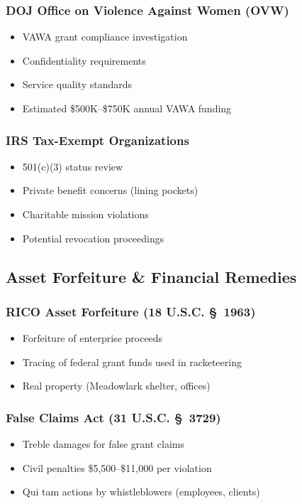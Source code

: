 \documentclass[11pt,letterpaper]{article}
\begin{document}
\subsubsection{DOJ Office on Violence Against Women (OVW)}
\begin{itemize}[leftmargin=*]
\item VAWA grant compliance investigation
\item Confidentiality requirements
\item Service quality standards
\item Estimated \$500K--\$750K annual VAWA funding
\end{itemize}

\subsubsection{IRS Tax-Exempt Organizations}
\begin{itemize}[leftmargin=*]
\item 501(c)(3) status review
\item Private benefit concerns (lining pockets)
\item Charitable mission violations
\item Potential revocation proceedings
\end{itemize}

\subsection{Asset Forfeiture \& Financial Remedies}

\subsubsection{RICO Asset Forfeiture (18 U.S.C. \S~1963)}
\begin{itemize}[leftmargin=*]
\item Forfeiture of enterprise proceeds
\item Tracing of federal grant funds used in racketeering
\item Real property (Meadowlark shelter, offices)
\end{itemize}

\subsubsection{False Claims Act (31 U.S.C. \S~3729)}
\begin{itemize}[leftmargin=*]
\item Treble damages for false grant claims
\item Civil penalties \$5,500--\$11,000 per violation
\item Qui tam actions by whistleblowers (employees, clients)
\end{itemize}
\end{document}
